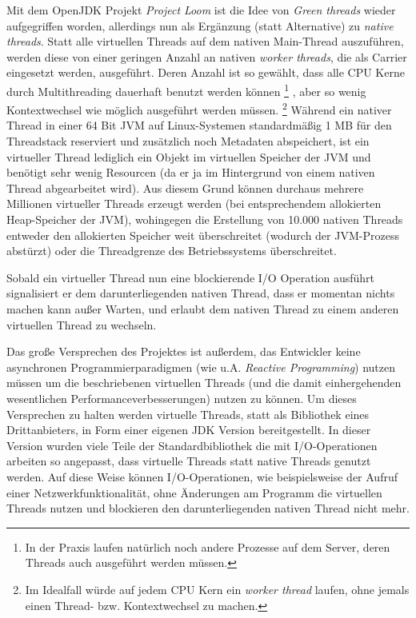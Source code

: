 Mit dem OpenJDK Projekt \textit{Project Loom} ist die Idee von \textit{Green threads}
wieder aufgegriffen worden, allerdings nun als Ergänzung (statt Alternative) zu \textit{native threads}.
Statt alle virtuellen Threads auf dem nativen Main-Thread auszuführen, werden diese von einer geringen Anzahl an nativen \textit{worker threads},
die als Carrier eingesetzt werden, ausgeführt.
Deren Anzahl ist so gewählt, dass alle CPU Kerne durch Multithreading dauerhaft benutzt werden können
\footnote{In der Praxis laufen natürlich noch andere Prozesse auf dem Server, deren Threads auch ausgeführt werden müssen.}
, aber so wenig Kontextwechsel wie möglich ausgeführt werden müssen.
\parencite{Oracle2021} \footnote{Im Idealfall würde auf jedem CPU Kern ein \textit{worker thread} laufen,
	ohne jemals einen Thread- bzw. Kontextwechsel zu machen.}
Während ein nativer Thread in einer 64 Bit JVM auf Linux-Systemen standardmäßig 1 MB für den Threadstack reserviert
und zusätzlich noch Metadaten abspeichert, ist ein virtueller Thread
lediglich ein Objekt im virtuellen Speicher der JVM und benötigt sehr wenig Resourcen (da er ja im Hintergrund von einem
nativen Thread abgearbeitet wird).
Aus diesem Grund können durchaus mehrere Millionen virtueller Threads erzeugt werden (bei entsprechendem allokierten Heap-Speicher der JVM), wohingegen
die Erstellung von 10.000 nativen Threads entweder den allokierten Speicher weit überschreitet (wodurch der JVM-Prozess abstürzt) oder die Threadgrenze
des Betriebssystems überschreitet.

Sobald ein virtueller Thread nun eine blockierende I/O Operation ausführt signalisiert er dem darunterliegenden nativen Thread, dass er momentan nichts machen
kann außer Warten, und erlaubt dem nativen Thread zu einem anderen virtuellen Thread zu wechseln.

Das große Versprechen des Projektes ist außerdem, das Entwickler keine asynchronen Programmierparadigmen (wie u.A. \textit{Reactive Programming})
nutzen müssen um die beschriebenen virtuellen Threads (und die damit einhergehenden wesentlichen Performanceverbesserungen) nutzen zu können.
Um dieses Versprechen zu halten werden virtuelle Threads, statt als Bibliothek eines Drittanbieters, in Form einer eigenen JDK Version bereitgestellt.
In dieser Version wurden viele Teile der Standardbibliothek die mit I/O-Operationen arbeiten so angepasst, dass virtuelle Threads statt native Threads
genutzt werden. Auf diese Weise können I/O-Operationen, wie beispielsweise der Aufruf einer Netzwerkfunktionalität, ohne Änderungen am Programm
die virtuellen Threads nutzen und blockieren den darunterliegenden nativen Thread nicht mehr.

